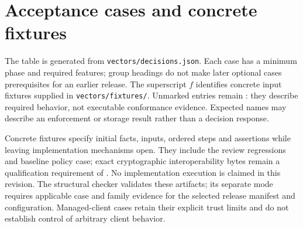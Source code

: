 \section{Acceptance cases and concrete fixtures}\label{app:vectors}
The table is generated from \texttt{vectors/decisions.json}. Each case has a minimum phase and required features; group headings do not make later optional cases prerequisites for an earlier release. The superscript $f$ identifies concrete input fixtures supplied in \texttt{vectors/fixtures/}. Unmarked entries remain : they describe required behavior, not executable conformance evidence. Expected names may describe an enforcement or storage result rather than a decision response.

Concrete fixtures specify initial facts, inputs, ordered steps and assertions while leaving implementation mechanisms open. They include the review regressions and baseline policy case; exact cryptographic interoperability bytes remain a qualification requirement of . No implementation execution is claimed in this revision. The structural checker validates these artifacts; its separate  mode requires applicable case and family evidence for the selected release manifest and configuration. Managed-client cases retain their explicit trust limits and do not establish control of arbitrary client behavior.

